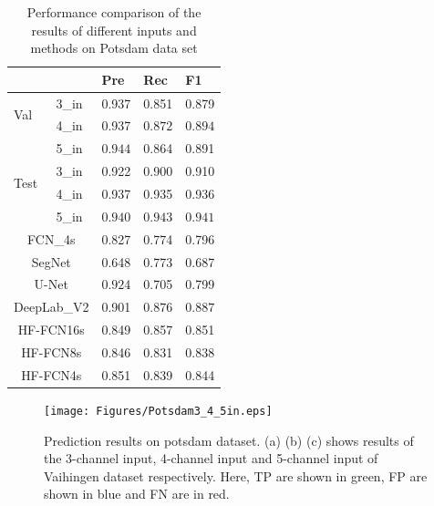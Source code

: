 \begin{table}[htbp]
\caption {Performance comparison of the results of different inputs and methods on Potsdam data set}
\label{table:Potsdam-3-4-5in-comp}
\centering
\begin{tabular}{p{0.5cm}<{\centering}|p{1.1cm}<{\centering}|p{1.1cm}<{\centering}|p{1.1cm}<{\centering}|p{1.1cm}<{\centering}}
\hline
&&Pre&Rec&F1\\
\hline
\multirow{2}{*}{Val}&3\_in&0.937&0.851&0.879\\
&4\_in&0.937&$\bm{0.872}$&$\bm{0.894}$\\
&5\_in&$\bm{0.944}$&0.864&0.891\\
\hline
\multirow{2}{*}{Test}&3\_in&0.922&0.900&0.910\\
&4\_in&0.937&0.935&0.936\\
&5\_in&$\bm{0.940}$&$\bm{0.943}$&$\bm{0.941}$\\
\hline\hline
\multicolumn{2}{c|}{FCN\_4s\cite{IEEEexample:Long_2015_CVPR}}&{0.827}&{0.774}&{0.796}\\
\multicolumn{2}{c|}{SegNet\cite{IEEEexample:badrinarayanan2017segnet}}&{0.648}&{0.773}&{0.687}\\
\multicolumn{2}{c|}{U-Net\cite{IEEEexample:ronneberger2015u}}&$\bm{0.924}$&{0.705}&{0.799}\\
\multicolumn{2}{c|}{DeepLab\_V2\cite{IEEEexample:chen2016deeplab}}&{0.901}&$\bm{0.876}$&$\bm{0.887}$\\
\hline \hline
\multicolumn{2}{c|}{HF-FCN16s}&{0.849}&{0.857}&{0.851}\\
\multicolumn{2}{c|}{HF-FCN8s}&{0.846}&{0.831}&{0.838}\\
\multicolumn{2}{c|}{HF-FCN4s}&{0.851}&{0.839}&{0.844}\\
\hline
\end{tabular}
\end{table}
\begin{figure}
\centering
\texttt{[image: Figures/Potsdam3\_4\_5in.eps]}
\caption{Prediction results on potsdam dataset. (a) (b) (c) shows results of the 3-channel input, 4-channel input and 5-channel input of Vaihingen dataset respectively. Here, TP are shown in green, FP are shown in blue and FN are in red.}
\label{fig:Potsdam-3-4-5in-visi}
\end{figure}

